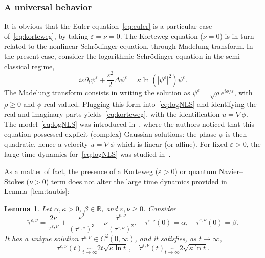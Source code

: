 \documentclass[10pt]{amsart}
\newtheorem{lemm}[theo]{Lemma}\newtheorem{prop}[theo]{Proposition}\newtheorem{coro}[theo]{Corollary}\newtheorem{conj}[theo]{Conjecture}
\theoremstyle{definition}\newtheorem{defi}[theo]{Definition}\newtheorem{rema}[theo]{Remark}\newtheorem{exam}[theo]{Example}\newtheorem{exem}[theo]{Example}\newtheorem{nota}[theo]{Notation}
\newcommand*\R{\mathbb{R}}
\newcommand*\<{\left\langle}
\renewcommand*\>{\right\rangle}
\renewcommand*\ge{\geqslant}
\newcommand*\Eq[2]{\mathop{\sim}\limits_{#1\rightarrow#2}}
\newcommand*\eps{\varepsilon}
\begin{document}
\subsubsection{A universal behavior}

It is obvious that the Euler equation~\eqref{eq:euler} is a particular case of~\eqref{eq:korteweg}, by taking $\eps=\nu=0$. The Korteweg equation ($\nu=0$) is in turn related to the nonlinear Schr\"odinger equation, through Madelung transform. In the present case, consider the logarithmic Schr\"odinger equation in the semi-classical regime,
\begin{equation}\label{eq:logNLS}
i\eps\partial_t \psi^\eps +\frac{\eps^2}{2} \Delta \psi^\eps =\kappa
\ln\left(|\psi^\eps|^2\right)\psi^\eps.
\end{equation}
The Madelung transform consists in writing the solution as $\psi^\eps=\sqrt\rho e^{i\phi/\eps}$, with $\rho\ge 0$ and $\phi$ real-valued. Plugging this form into~\eqref{eq:logNLS} and identifying the real and imaginary parts yields~\eqref{eq:korteweg}, with the identification $u=\nabla \phi$. The model~\eqref{eq:logNLS} was introduced in~\cite{BiMy76}, where the authors noticed that this equation possessed explicit (complex) Gaussian solutions: the phase $\phi$ is then quadratic, hence a velocity $u=\nabla \phi$ which is linear (or affine). For fixed $\eps>0$, the large time dynamics for~\eqref{eq:logNLS} was studied in~\cite{CaGa18}.

As a matter of fact, the presence of a Korteweg ($\eps>0$) or quantum Navier--Stokes ($\nu>0$) term does not alter the large time dynamics provided in Lemma~\ref{lem:taubis}:

\begin{lemm}\label{lem:ODE2}
Let $\alpha,\kappa>0$, $\beta\in \R$, and $\eps,\nu\ge 0$. Consider
\begin{equation}\label{eq:tau-quant}
\ddot \tau^{\eps,\nu} =
\frac{2\kappa }{\tau^{\eps,\nu}}+\frac{\eps^2}{(\tau^{\eps,\nu})^3}-\nu
\frac{\dot \tau^{\eps,\nu}}{(\tau^{\eps,\nu})^2},\quad
\tau^{\eps,\nu}(0)=\alpha,\quad \dot \tau^{\eps,\nu}(0)=\beta.
\end{equation}
It has a unique solution $\tau^{\eps,\nu}\in C^2(0,\infty)$, and it satisfies, as $t\to \infty$,
\begin{equation*}
\tau^{\eps,\nu}(t)\Eq t \infty 2t \sqrt{\kappa \ln t} \,,\quad \dot
\tau^{\eps,\nu}(t)\Eq t \infty 2\sqrt{\kappa\ln t}.
\end{equation*}
\end{lemm}
\end{document}

